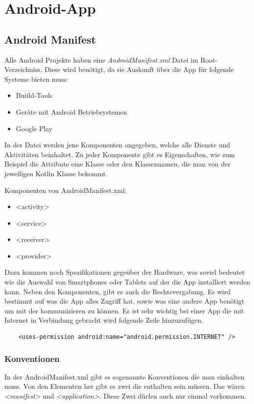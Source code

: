 \section{Android-App}
\author{Bozidar Spasenovic}
\subsection{Android Manifest}
Alle Android Projekte haben eine \textit{AndroidManifest.xml} Datei im Root-Verzeichniss. Diese wird benötigt, da sie  
Auskunft über die App für folgende Systeme bieten muss:

\begin{itemize}
    \item Buiild-Tools
    \item Geräte mit Android Betriebsystemen
    \item Google Play 
\end{itemize}  

In der Datei werden jene Komponenten angegeben, welche alle Dienste und Aktivitäten beinhaltet.
Zu jeder Komponente gibt es Eigenschaften, wie zum Beispiel die Attribute eine Klasse oder den Klassennamen,
 die man von der jeweiligen Kotlin Klasse bekommt.

 Komponenten von AndroidManifest.xml:

 \begin{itemize}
     \item <activity>
     \item <service>
     \item <receiver>
     \item <provider>    
 \end{itemize}



Dazu kommen noch Spezifikationen gegeüber der Hardware, was soviel bedeutet wie die Auswahl von Smartphones oder Tablets
auf der die App installiert werden kann.
 Neben den Komponenten, gibt es auch die Rechtevergabung. Es wird bestimmt auf was die App alles Zugriff hat, sowie
 was eine andere App benötigt um mit der kommunizieren zu können.
 Es ist sehr wichtig bei einer App die mit Internet in Verbindung gebracht wird folgende Zeile hinzuzufügen.
 
 \begin{lstlisting}
    <uses-permission android:name="android.permission.INTERNET" />
\end{lstlisting}

\subsubsection{Konventionen}
In der AndroidManifest.xml gibt es sogenannte Konventionen die man einhalten muss.
Von den Elementen her gibt es zwei die enthalten sein müssen. Das wären \textit{<manifest>} und \textit{<application>}.
Diese Zwei dürfen auch nur einmal vorkommen.

